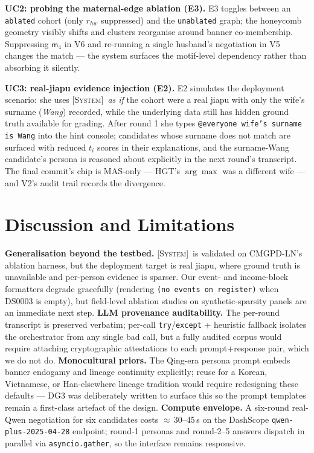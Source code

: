 \documentclass[review]{vgtc}                  %
\newcommand{\system}{\textsc{[System]}\xspace}
\begin{document}
\textbf{UC2: probing the maternal-edge ablation (E3).}
E3 toggles between an \texttt{ablated} cohort (only $r_{hw}$
suppressed) and the \texttt{unablated} graph; the honeycomb geometry
visibly shifts and clusters reorganise around banner co-membership.
Suppressing $\mathsf{m}_4$ in V6 and re-running a single husband's
negotiation in V5 changes the match --- the system surfaces the
motif-level dependency rather than absorbing it silently.

\textbf{UC3: real-jiapu evidence injection (E2).}
E2 simulates the deployment scenario: she uses \system\ \emph{as if}
the cohort were a real jiapu with only the wife's surname
(\emph{Wang}) recorded, while the underlying data still has hidden
ground truth available for grading. After round 1 she types
\texttt{@everyone wife's surname is Wang} into the hint console;
candidates whose surname does not match are surfaced with reduced
$t_i$ scores in their explanations, and the surname-Wang candidate's
persona is reasoned about explicitly in the next round's transcript.
The final commit's chip is \textsf{MAS}-only --- HGT's $\arg\max$
was a different wife --- and V2's audit trail records the divergence.

\section{Discussion and Limitations}
\label{sec:discussion}

\textbf{Generalisation beyond the testbed.}
\system\ is validated on CMGPD-LN's ablation harness, but the
deployment target is real jiapu, where ground truth is unavailable
and per-person evidence is sparser. Our event- and income-block
formatters degrade gracefully (rendering \texttt{(no events on
register)} when DS0003 is empty), but field-level ablation studies
on synthetic-sparsity panels are an immediate next step.
\textbf{LLM provenance auditability.} The per-round transcript is
preserved verbatim; per-call \texttt{try}/\texttt{except} +
heuristic fallback isolates the orchestrator from any single bad
call, but a fully audited corpus would require attaching cryptographic
attestations to each prompt+response pair, which we do not do.
\textbf{Monocultural priors.} The Qing-era persona prompt embeds
banner endogamy and lineage continuity explicitly; reuse for a
Korean, Vietnamese, or Han-elsewhere lineage tradition would require
redesigning these defaults --- DG3 was deliberately written to surface
this so the prompt templates remain a first-class artefact of the
design.
\textbf{Compute envelope.} A six-round real-Qwen negotiation for six
candidates costs $\approx$\,30--45\,s on the DashScope
\texttt{qwen-plus-2025-04-28} endpoint; round-1 personas and
round-2--5 answers dispatch in parallel via
\texttt{asyncio.gather}, so the interface remains responsive.
\end{document}
